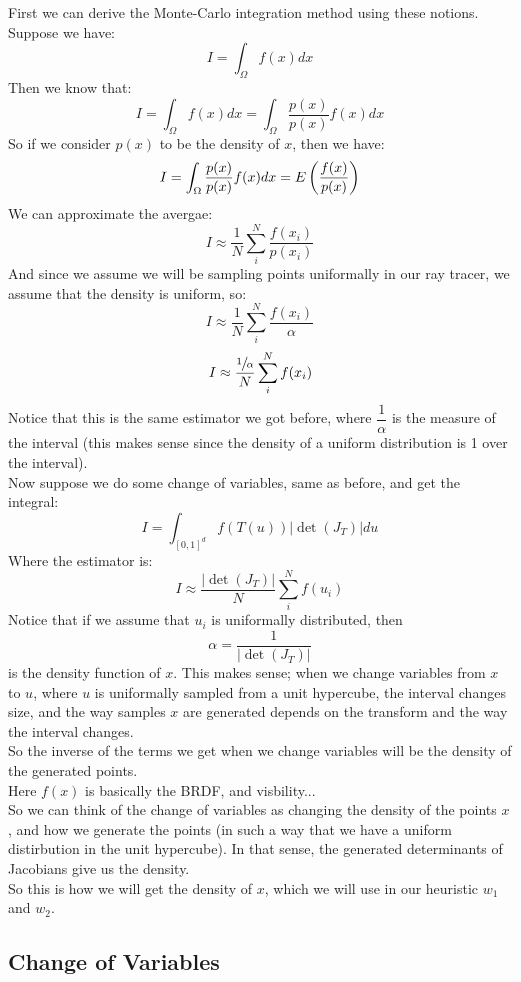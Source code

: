 \documentclass[12pt]{article}
\begin{document}
First we can derive the Monte-Carlo integration
method using these notions. \\
Suppose we have:
\[ I = \int_\Omega f(x)dx \]
Then we know that:
\[ I = \int_\Omega f(x) dx 
= \int_\Omega \dfrac{p(x)}{p(x)}f(x) dx  \]
So if we consider $p(x)$ to be the 
density of $x$, then we have:
\[ I = 
\int_\Omega \dfrac{p(x)}{p(x)}f(x) dx 
= E\left( \dfrac{f(x)}{p(x)} \right) \]
We can approximate the avergae:
\[ I \approx
\dfrac{1}{N}\sum_i^N\dfrac{f(x_i)}{p(x_i)} \]
And since we assume we will be sampling points
uniformally in our ray tracer, we assume that the
density is uniform, so:
\[ I \approx
\dfrac{1}{N}\sum_i^N\dfrac{f(x_i)}{\alpha} \]
\[ I \approx
\dfrac{\sfrac{1}{\alpha}}{N}\sum_i^N f(x_i) \]
Notice that this is the same estimator we got before,
where $\dfrac{1}{\alpha}$ is the measure of the interval
(this makes sense since the density of a uniform
distribution is 1 over the interval). \\

Now suppose we do some change of variables,
same as before, and get the integral:
\[ I = \int_{[0, 1]^d} f(T(u)) |\det(J_T)|du  \]
Where the estimator is:
\[ I \approx \dfrac{|\det(J_T)|}{N}\sum_i^N f(u_i) \]
Notice that if we assume that $u_i$
is uniformally distributed, then
\[ \alpha = \dfrac{1}{|\det(J_T)|} \]
is the density function of $x$.
This makes sense; when we change variables from
$x$ to $u$, where $u$ is uniformally
sampled from a unit hypercube,
the interval changes size, and the way 
samples $x$ are generated 
depends on the transform and the 
way the interval changes. \\

So the inverse of the terms we get
when we change variables will be the density
of the generated points. \\
Here $f(x)$ is basically the BRDF,
and visbility... \\

So we can think of the change of variables
as changing the density of the points $x$,
and how we generate the points
(in such a way that we have a uniform
distirbution in the unit hypercube).
In that sense, the generated determinants
of Jacobians give us the density. \\

So this is how we will get the density
of $x$, which we will use in our heuristic 
$w_1$ and $w_2$. \\

\newpage

\subsection*{Change of Variables}
\end{document}
